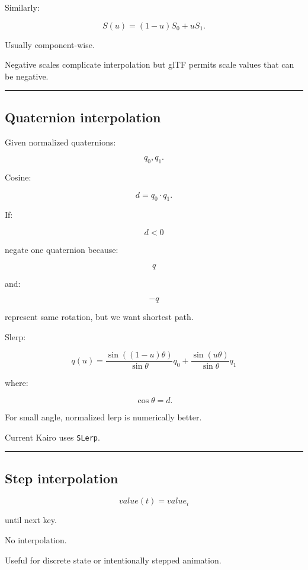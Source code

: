 Similarly:

\[
\boxed{
S(u)
=
(1-u)S_0+uS_1.
}
\]

Usually component-wise.

Negative scales complicate interpolation but glTF permits scale values that can be negative.

\begin{center}\rule{0.5\linewidth}{0.5pt}\end{center}

\subsection{Quaternion interpolation}\label{04-visual-computing-ii-ch041-quaternion-interpolation}

Given normalized quaternions:

\[
q_0,q_1.
\]

Cosine:

\[
d=q_0\cdot q_1.
\]

If:

\[
d<0
\]

negate one quaternion because:

\[
q
\]

and:

\[
-q
\]

represent same rotation, but we want shortest path.

Slerp:

\[
\boxed{
q(u)
=
\frac{
\sin((1-u)\theta)
}{
\sin\theta
}
q_0
+
\frac{
\sin(u\theta)
}{
\sin\theta
}
q_1
}
\]

where:

\[
\cos\theta=d.
\]

For small angle, normalized lerp is numerically better.

Current Kairo uses \texttt{SLerp}.

\begin{center}\rule{0.5\linewidth}{0.5pt}\end{center}

\subsection{Step interpolation}\label{04-visual-computing-ii-ch041-step-interpolation}

\[
value(t)=value_i
\]

until next key.

No interpolation.

Useful for discrete state or intentionally stepped animation.

